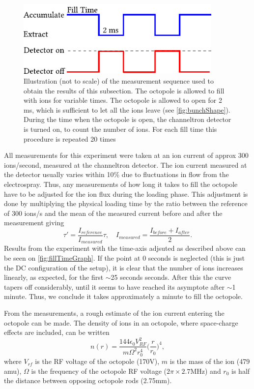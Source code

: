 \begin{figure}
    \centering
    \includegraphics[width = 0.9\textwidth]{main/StoragePulse.pdf}
    \caption{Illustration (not to scale) of the measurement sequence used to obtain the results of this subsection. The octopole is allowed to fill with ions for variable times. The octopole is allowed to open for 2 ms, which is sufficient to let all the ions leave (see \cref{fig:bunchShape}). During the time when the octopole is open,
    the channeltron detector is turned on, to count the number of ions. For each fill time this procedure is repeated 20 times}
    \label{fig:storageSequence}
\end{figure}
All measurements for this experiment were taken at an ion current of approx 300 ions/second, measured at the channeltron detector.
The ion current measured at the detector usually varies within 10\% due to fluctuations in flow from the electrospray. Thus, any measurements of how long it takes to fill the octopole have to be adjusted for the ion flux during the loading phase.  This adjustment is done by multiplying the physical loading time by the ratio between the reference of 300 ions/s and the mean of the measured current before and after the measurement giving
\begin{equation}
    \tau'= \frac{I_{reference}}{I_{measured}}\tau,\quad I_{measured} = \frac{I_{before}+I_{after}}{2}.
\end{equation}
Results from the experiment with the time-axis adjsuted as described above can be seen on \cref{fig:fillTimeGraph}. If the point at 0 seconds is neglected (this is just the DC configuration of the setup), it is clear that the number of ions increases linearly, as expected, for the first $\sim$25 seconds seconds.
After this the curve tapers off considerably, until it seems to have reached its asymptote after $\sim$1 minute. Thus, we conclude it takes approximately a minute to fill the octopole.

From the measurements, a rough estimate of the ion current entering the octopole can be made.
The density of ions in an octopole, where space-charge effects are included, can be written \cite{MajimaDensity}
\begin{equation}
    n(r) = \frac{144\epsilon_0 V_{RF}^2}{m\Omega^2r_0^4}\bigg(\frac{r}{r_0}\bigg)^4,
\end{equation}
where $V_{rf}$ is the RF voltage of the octopole (170V), $m$ is the mass of the ion (479 amu), $\Omega$ is the frequency of the octopole RF voltage ($2\pi\times2.7$MHz) and $r_0$ is half the distance between opposing octopole rods (2.75mm).


